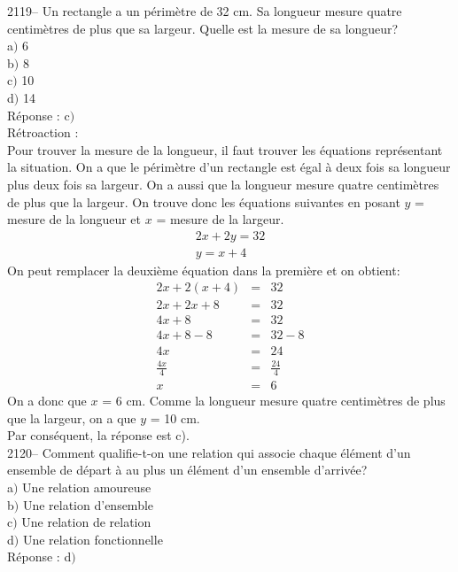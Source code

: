 \documentclass[letterpaper, 12pt]{article}
\begin{document}
2119-- Un rectangle a un p\'erim\`etre de 32 cm. Sa longueur mesure quatre centim\`etres de plus que sa largeur. Quelle est la mesure de sa longueur? \\

a$)$ 6\\
b$)$ 8\\
c$)$ 10\\
d$)$ 14\\

R\'eponse : c$)$\\

R\'etroaction :\\
Pour trouver la mesure de la longueur, il faut trouver les \'equations repr\'esentant la situation. On a que le p\'erim\`etre d'un rectangle est \'egal \`a deux fois sa longueur plus deux fois sa largeur. On a aussi que la longueur mesure quatre centim\`etres de plus que la largeur. On trouve donc les \'equations suivantes en posant $y$ = mesure de la longueur et $x$ = mesure de la largeur.
\begin{eqnarray*}
 2x+2y=32\\
y=x+4
\end{eqnarray*}
On peut remplacer la deuxi\`eme \'equation dans la premi\`ere et on obtient:
\begin{eqnarray*}
 2x+2(x+4)&=&32\\
2x+2x+8&=&32\\
4x+8&=&32\\
4x+8-8&=&32-8\\
4x&=&24\\[2mm]
\frac{4x}{4}&=&\frac{24}{4}\\[2mm]
x&=&6
\end{eqnarray*}
On a donc que $x$ = 6 cm. Comme la longueur mesure quatre centim\`etres de plus que la largeur, on a que $y$ = 10 cm.\\
Par cons\'equent, la r\'eponse est c).\\

2120-- Comment qualifie-t-on une relation qui associe chaque \'el\'ement d'un ensemble de d\'epart \`a au plus un \'el\'ement d'un ensemble d'arriv\'ee? \\

a$)$ Une relation amoureuse \\
b$)$ Une relation d'ensemble\\
c$)$ Une relation de relation\\
d$)$ Une relation fonctionnelle\\

R\'eponse : d$)$ \\
\end{document}
